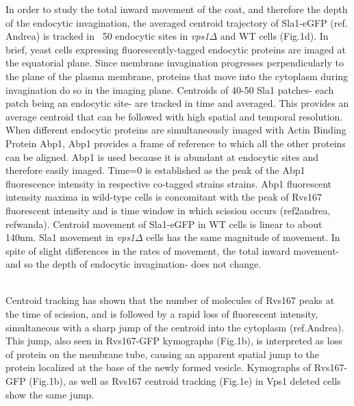 \documentclass[9pt,lineno]{elife}
\begin{document}
In order to study the total inward movement of the coat, and therefore the depth of the endocytic invagination, the averaged centroid trajectory of Sla1-eGFP (ref. Andrea) is tracked in ~50 endocytic sites in \textit{vps1$\Delta$} and WT cells (Fig.1d). In brief, yeast cells expressing fluorescently-tagged endocytic proteins are imaged at the equatorial plane. Since membrane invagination progresses perpendicularly to the plane of the plasma membrane, proteins that move into the cytoplasm during invagination do so in the imaging plane. Centroids of 40-50 Sla1 patches- each patch being an endocytic site- are tracked in time and  averaged. This provides an average centroid that can be followed with high spatial and temporal resolution. 
When different endocytic proteins are simultaneously imaged with Actin Binding Protein Abp1, Abp1 provides a frame of reference to which all the other proteins can be aligned. Abp1 is used because it is abundant at endocytic sites and therefore easily imaged. Time=0 is established as the peak of the Abp1 fluorescence intensity in respective co-tagged strains strains. Abp1 fluorescent intensity maxima in wild-type cells is concomitant with the peak of Rvs167 fluorescent intensity and is time window in which scission occurs (ref2andrea, refwanda).  
Centroid movement of Sla1-eGFP in WT cells is linear to about 140nm. Sla1 movement in \textit{vps1$\Delta$} cells has the same magnitude of movement. In spite of slight differences in the rates of movement, the total inward movement- and so the depth of endocytic invagination- does not change. 

~\\

Centroid tracking has shown that the number of molecules of Rvs167 peaks at the time of scission, and is followed by a rapid loss of fluorescent intensity, simultaneous with a sharp jump of the centroid into the cytoplasm (ref.Andrea). This jump, also seen in Rvs167-GFP kymographs (Fig.1b), is interpreted as loss of protein on the membrane tube, causing an apparent spatial jump to the protein localized at the base of the newly formed vesicle. Kymographs of Rvs167-GFP (Fig.1b), as well as Rvs167 centroid tracking (Fig.1e) in Vps1 deleted cells show the same jump.
~\\
\end{document}
